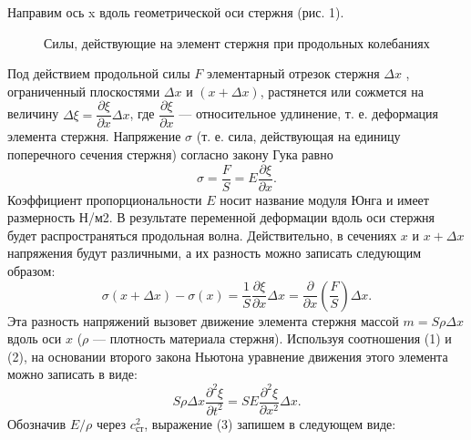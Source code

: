 \documentclass[a4paper, 12pt]{article}%
\begin{document}
Направим ось x вдоль геометрической оси стержня (рис. 1).
\begin{figure}[h!]
\caption{Силы, действующие на элемент стержня при продольных колебаниях}
\end{figure}
Под действием
продольной силы $F$ элементарный отрезок стержня $\Delta x$ , ограниченный
плоскостями $\Delta x$ и $(x+\Delta x)$, растянется или сожмется на величину $\Delta\xi=\dfrac{\partial \xi}{\partial x}\Delta x$, где $\dfrac{\partial\xi}{\partial x}$ — относительное удлинение, т. е. деформация элемента стержня. Напряжение $\sigma$ (т. е. сила, действующая на единицу поперечного
сечения стержня) согласно закону Гука равно
\begin{equation}
\sigma=\frac{F}{S}=E\dfrac{\partial \xi}{\partial x}.
\end{equation}
Коэффициент пропорциональности $E$ носит название модуля Юнга и имеет размерность Н/м2. В результате переменной деформации вдоль оси стержня будет распространяться
продольная волна. Действительно, в сечениях $x$ и $x+\Delta x$
напряжения будут различными, а их разность можно записать следующим
образом: 
\begin{equation}
\sigma(x+\Delta x)-\sigma(x)=\frac{1}{S}\dfrac{\partial\xi}{\partial x}\Delta x=\frac{\partial}{\partial x}\left(\frac{F}{S}\right)\Delta x.
\end{equation}
Эта разность напряжений вызовет движение элемента стержня массой
$m=S\rho\Delta x$ вдоль оси $x$ ($\rho$ — плотность материала стержня). Используя
соотношения (1) и (2), на основании второго закона Ньютона уравнение
движения этого элемента можно записать в виде: 
\begin{equation}
S\rho\Delta x\dfrac{\partial^2\xi}{\partial t^2}=SE\dfrac{\partial^2\xi}{\partial x^2}\Delta x.
\end{equation}
Обозначив $E/\rho$ через $c^2_{\text{ст}}$, выражение (3) запишем в следующем виде: 
\end{document}
